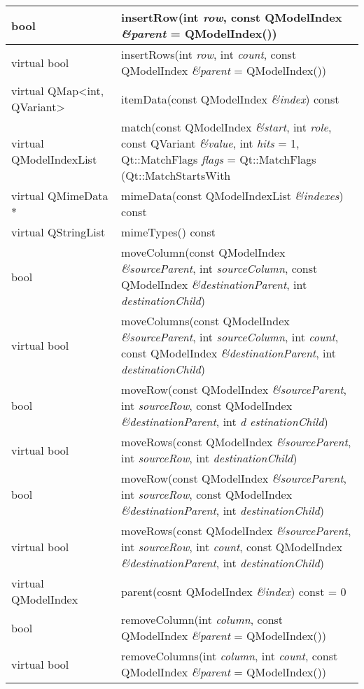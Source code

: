 \begin{longtable}[l]{|m{10em}|m{30em}|}
\hline
bool&	insertRow(int \emph{row}, const QModelIndex \emph{\&parent} = QModelIndex())\\
\hline
virtual bool&	insertRows(int \emph{row}, int \emph{count}, const QModelIndex \emph{\&parent}
              = QModelIndex())\\
\hline
virtual QMap<int, QVariant>	&itemData(const QModelIndex \emph{\&index}) const\\
\hline
virtual QModelIndexList	& match(const QModelIndex \emph{\&start}, int \emph{role}, const QVariant \emph{\&value}, int \emph{hits} = 1, Qt::MatchFlags \emph{flags} = Qt::MatchFlags (Qt::MatchStartsWith\\
\hline
virtual QMimeData *	&mimeData(const QModelIndexList \emph{\&indexes}) const\\
\hline
virtual QStringList	& mimeTypes() const\\
\hline
bool	&moveColumn(const QModelIndex \emph{\&sourceParent}, int \emph{sourceColumn},
       const QModelIndex \emph{\&destinationParent}, int \emph{destinationChild})\\
\hline
virtual bool & moveColumns(const QModelIndex \emph{\&sourceParent}, int
\emph{sourceColumn}, int \emph{count}, const QModelIndex
\emph{\&destinationParent}, int \emph{destinationChild})\\
\hline
bool& moveRow(const QModelIndex \emph{\&sourceParent}, int \emph{sourceRow}, const QModelIndex \emph{\&destinationParent}, int \emph{d
estinationChild})\\
\hline
virtual bool &moveRows(const QModelIndex \emph{\&sourceParent}, int \emph{sourceRow}, int \emph{destinationChild})\\
\hline
bool &moveRow(const QModelIndex \emph{\&sourceParent}, int \emph{sourceRow}, 
       const QModelIndex \emph{\&destinationParent}, 
       int  \emph{destinationChild})\\    
\hline           
virtual bool &moveRows(const QModelIndex \emph{\&sourceParent}, int \emph{sourceRow}, 
               int \emph{count}, const QModelIndex \emph{\&destinationParent}, int \emph{destinationChild})\\
\hline
virtual QModelIndex& parent(cosnt QModelIndex \emph{\&index}) const = 0\\
\hline
bool&	removeColumn(int \emph{column}, const QModelIndex \emph{\&parent} = QModelIndex())\\
\hline
virtual bool&	removeColumns(int \emph{column}, int \emph{count}, const QModelIndex \emph{\&parent} = QModelIndex())\\

\end{longtable}
